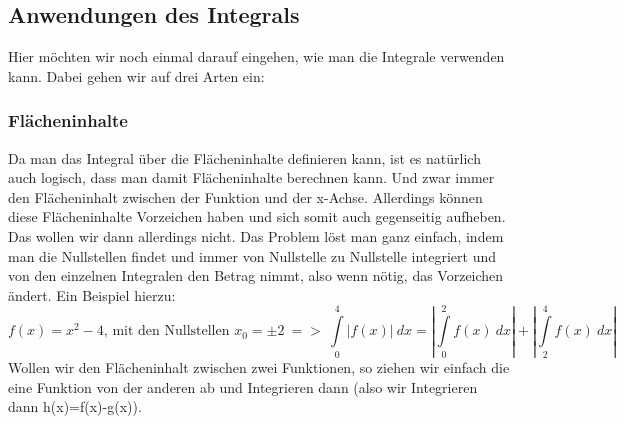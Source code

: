 \subsection{Anwendungen des Integrals}
	Hier möchten wir noch einmal darauf eingehen, wie man die Integrale verwenden
	kann. Dabei gehen wir auf drei Arten ein:

	\subsubsection{Flächeninhalte}
		Da man das Integral über die Flächeninhalte definieren kann, ist es natürlich
		auch logisch, dass man damit Flächeninhalte berechnen kann. Und zwar immer
		den Flächeninhalt zwischen der Funktion und der x-Achse. Allerdings können diese Flächeninhalte Vorzeichen haben und sich somit auch gegenseitig aufheben. Das wollen wir dann allerdings nicht. Das Problem löst man ganz einfach, indem man die Nullstellen findet und immer von Nullstelle zu Nullstelle integriert und von den einzelnen Integralen den Betrag nimmt, also wenn nötig, das Vorzeichen ändert. Ein Beispiel hierzu:
		\[f(x)=x^2-4\textrm{, mit den Nullstellen }x_0=\pm2\ =>\ \int\limits_0^4
		|f(x)|\ dx=|\int\limits_0^2 f(x)\ dx|+|\int\limits_2^4 f(x)\ dx|\]
		Wollen wir den Flächeninhalt zwischen zwei Funktionen, so ziehen wir einfach
		die eine Funktion von der anderen ab und Integrieren dann (also wir Integrieren dann h(x)=f(x)-g(x)).

